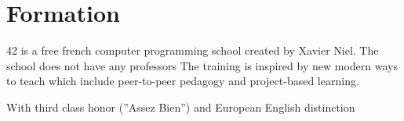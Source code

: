 \documentclass[a4paper]{deedy-resume} %
\begin{document}










\section{Formation}

\begin{description}
 \item {42 is a free french computer programming school created by Xavier Niel. The school does not have any professors The training is inspired by new modern ways to teach which include peer-to-peer pedagogy and project-based learning.}
\end{description}


\sectionspace %



\begin{description}
\item With third class honor (”Assez Bien”) and European English distinction
\end{description}
\sectionspace %
\end{document}
